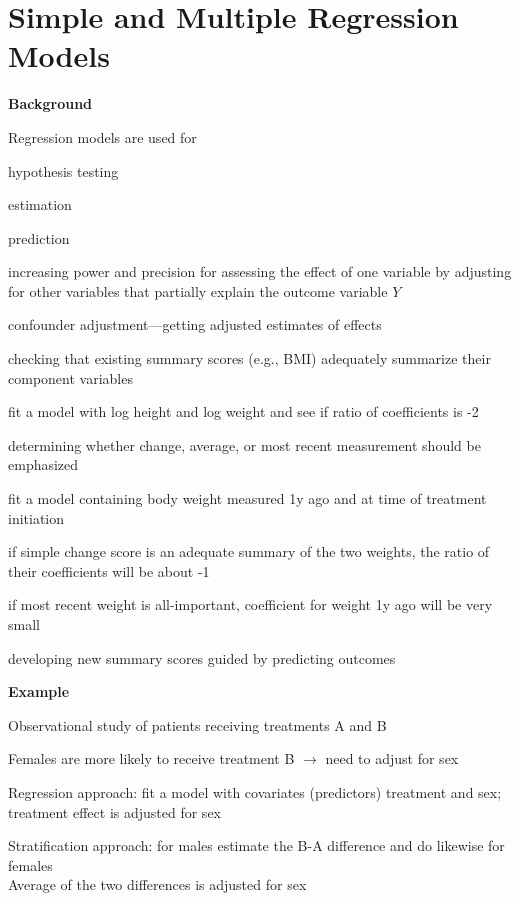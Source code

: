 

\chapter{Simple and Multiple Regression Models}
{\larger\textbf{Background}}

Regression models are used for
\bi
\item hypothesis testing
\item estimation
\item prediction
\item increasing power and precision for assessing the effect of one
  variable by adjusting for other variables that partially explain the outcome
  variable $Y$
\item confounder adjustment---getting adjusted estimates of effects
\item checking that existing summary scores (e.g., BMI) adequately
  summarize their component variables
  \bi
  \item fit a model with log height and log weight and see if ratio of
    coefficients is -2
  \ei
\item determining whether change, average, or most recent measurement
  should be emphasized
  \bi
  \item fit a model containing body weight measured 1y ago and at time
    of treatment initiation
  \item if simple change score is an adequate summary of the two
    weights, the ratio of their coefficients will be about -1
  \item if most recent weight is all-important, coefficient for weight
    1y ago will be very small
  \ei
\item developing new summary scores guided by predicting outcomes
\ei

{\larger\textbf{Example}}
\bi
\item Observational study of patients receiving treatments A and B
\item Females are more likely to receive treatment B $\rightarrow$
  need to adjust for sex
\item Regression approach: fit a model with covariates (predictors)
  treatment and sex; treatment effect is adjusted for sex
\item Stratification approach: for males estimate the B-A difference
  and do likewise for females\\Average of the two differences is
  adjusted for sex
\ei

